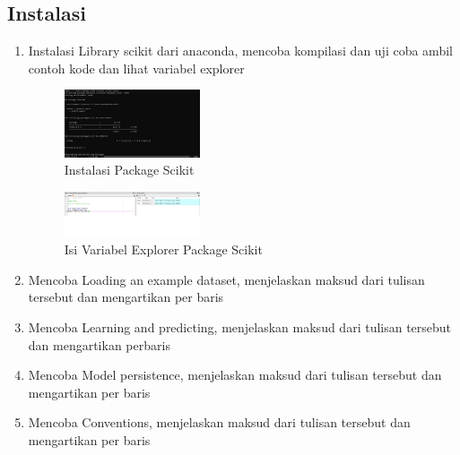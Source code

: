 \subsection{Instalasi}
\begin{enumerate}
	\item Instalasi Library scikit dari anaconda, mencoba kompilasi dan uji coba ambil contoh kode dan lihat variabel explorer
	\hfill\break
	\begin{figure}
		\includegraphics[width=4cm]{figures/1174071/1/1.PNG}
		\centering
		\caption{Instalasi Package Scikit}
	\end{figure}
	\begin{figure}
		\includegraphics[width=4cm]{figures/1174071/1/2.PNG}
		\centering
		\caption{Isi Variabel Explorer Package Scikit}
	\end{figure}
	\item Mencoba Loading an example dataset, menjelaskan maksud dari tulisan tersebut dan mengartikan  per baris
	\hfill\break
	
	\item Mencoba Learning and predicting, menjelaskan maksud dari tulisan tersebut dan mengartikan perbaris
	\hfill\break
	
	\item  Mencoba Model persistence, menjelaskan maksud dari tulisan tersebut dan mengartikan per baris
	\hfill\break
	
	\item Mencoba Conventions, menjelaskan maksud dari tulisan tersebut dan mengartikan per baris
	\hfill\break
	
\end{enumerate}

